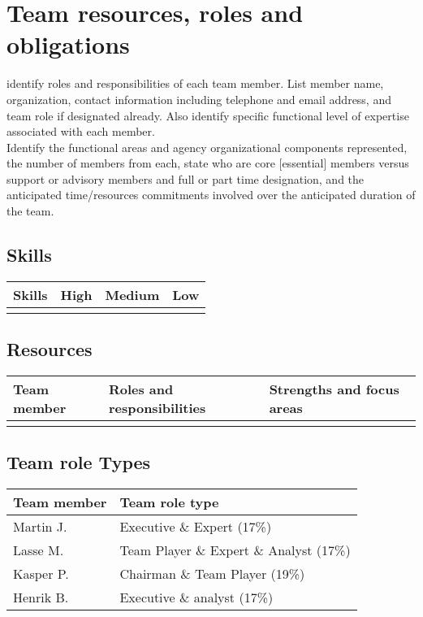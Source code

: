 \section{Team resources, roles and obligations}
identify roles and responsibilities of each team member. List member name, organization, contact
information including telephone and email address, and team role if designated already. Also identify
specific functional level of expertise associated with each member.\\
Identify the functional areas and agency organizational components represented, the number of members
from each, state who are core [essential] members versus support or advisory members and full or part time
designation, and the anticipated time/resources commitments involved over the anticipated duration of the
team.

\subsection{Skills}
\begin{table}
    \centering
    \begin{tabular}{l|l|l|l}
        \rowcolor{Gray}
        \textbf{Skills} & \textbf{High} & \textbf{Medium} & \textbf{Low}\\\hline
                             & & &
    \end{tabular}
    \label{tab:Skillz}
\end{table}

\subsection{Resources}

\begin{table}
    \centering
    \begin{tabular}{l|l|l}
        \rowcolor{Gray}
        \textbf{Team member} & \textbf{Roles and responsibilities} & \textbf{Strengths and focus areas}\\\hline
                             & &
    \end{tabular}
    \label{tab:resources}
\end{table}

\subsection{Team role Types}

\begin{table}
    \centering
    \begin{tabular}{l|l}
        \rowcolor{Gray}
        \textbf{Team member} & \textbf{Team role type}\\\hline
        Martin J.            & Executive \& Expert (17\%) \\
        Lasse M.             & Team Player \& Expert \& Analyst (17\%) \\
        Kasper P.            & Chairman \& Team Player (19\%) \\
        Henrik B.            & Executive \& analyst (17\%)
    \end{tabular}
    \label{tab:roleTypes}
\end{table}
